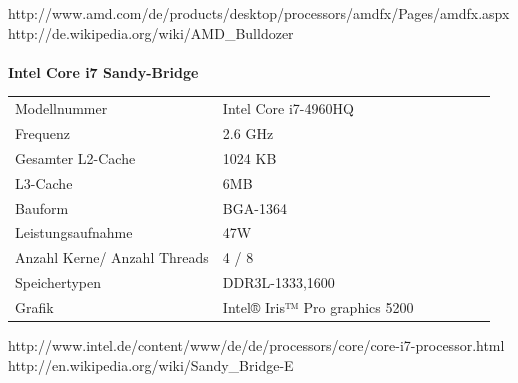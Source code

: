 \documentclass[10pt]{article}
\begin{document}
\begin{enumerate}[label=\alph*)]
	
	
	http://www.amd.com/de/products/desktop/processors/amdfx/Pages/amdfx.aspx\\
	http://de.wikipedia.org/wiki/AMD\_Bulldozer\\
	\\
	
	\textbf{Intel Core i7 Sandy-Bridge}\\
	\begin{tabular}{ l l l l l l l }
			Modellnummer & Intel Core i7-4960HQ\\
			Frequenz & 2.6 GHz\\
			Gesamter L2-Cache & 1024 KB\\
			L3-Cache & 6MB\\
			Bauform & BGA-1364\\ %
			Leistungsaufnahme & 47W\\
			Anzahl Kerne/ Anzahl Threads & 4 / 8\\
			Speichertypen & DDR3L-1333,1600\\
			Grafik & Intel® Iris™ Pro graphics 5200\\
		\end{tabular}

	
	
	
	
	http://www.intel.de/content/www/de/de/processors/core/core-i7-processor.html\\
	http://en.wikipedia.org/wiki/Sandy\_Bridge-E\\
\end{enumerate}
\end{document}
